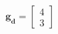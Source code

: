 \documentclass[preview]{standalone}
\begin{document}
\begin{align*}
\mathbf{g_d} = \begin{bmatrix} 4 \\ 3 \end{bmatrix}
\end{align*}
\end{document}
